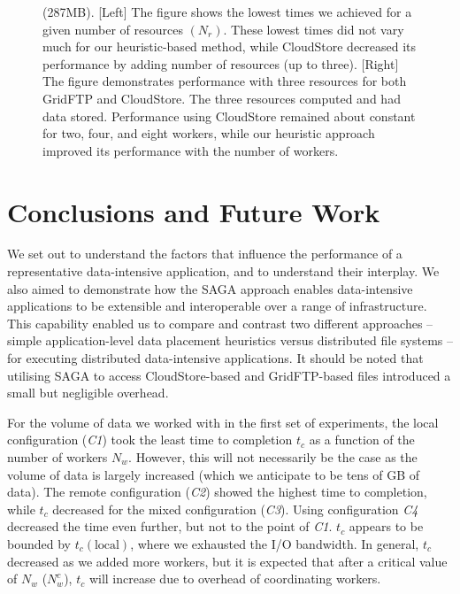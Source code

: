 \documentclass{rspublic}
\begin{document}
\begin{figure}
\begin{center}
{\label{Fig:CloudStoreVsGridFTP:b}
}
\caption{(287MB). [Left] The figure
 shows the lowest times we achieved for a given number of resources
 $(N_{r})$. These lowest times did not vary much for our heuristic-based 
 method, while CloudStore decreased its performance by adding number of
 resources (up to three). [Right] The figure
 demonstrates performance with three resources for both GridFTP and
 CloudStore. The three resources computed and had data stored.
 Performance using CloudStore remained about constant for two, four, and
 eight workers, while our heuristic approach improved its performance
 with the number of workers.}
\label{Fig:CloudStoreVsGridFTP}
\end{center}
\vspace{-0.4cm}
\end{figure}

%
\vspace{-0.3cm}

\section{Conclusions and Future Work}


We set out to understand the factors that influence the performance of
a representative data-intensive application, and to understand their
interplay. We also aimed to demonstrate how the SAGA approach enables
data-intensive applications to be extensible and interoperable over a
range of infrastructure. This capability enabled us to compare and
contrast two different approaches -- simple application-level data
placement heuristics versus distributed file systems -- for executing
distributed data-intensive applications. It should be noted that 
utilising SAGA to access CloudStore-based and GridFTP-based files
introduced a small but negligible overhead.

For the volume of data we worked with in the first set of experiments,
the local configuration (\textit{C1}) took the least time to completion $t_c$
as a function of the number of workers $N_w$. However, this will not
necessarily be the case as the volume of data is largely increased
(which we anticipate to be tens of GB of data). The remote
configuration (\textit{C2}) showed the highest time to completion, while
$t_c$ decreased for the mixed configuration (\textit{C3}). Using
configuration \textit{C4} decreased the time even further, but not to the
point of \textit{C1}. $t_c$ appears to be bounded by $t_c(\mbox{local})$,
where we exhausted the I/O bandwidth. In general, $t_c$ decreased as
we added more workers, but it is expected that after a critical value
of $N_w$ ($N^c_w$), $t_c$ will increase due to overhead of
coordinating workers.
\end{document}
